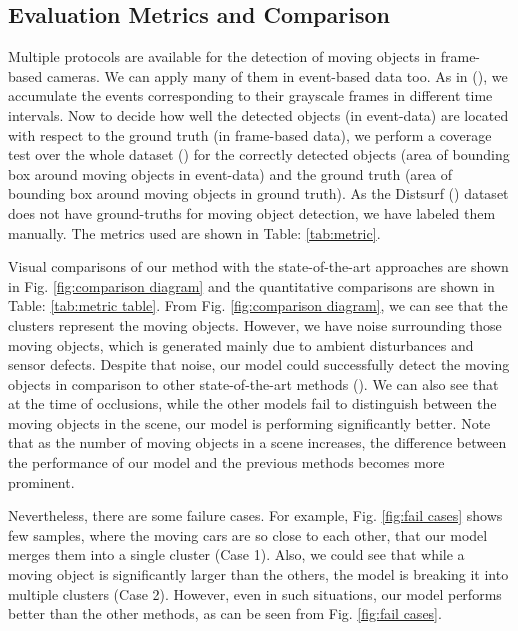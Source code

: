 \documentclass{article}
\begin{document}
\subsection{Evaluation Metrics and Comparison}

Multiple protocols are available for the detection of moving objects in frame-based cameras. We can apply many of them in event-based data too. As in (\cite{chen2018neuromorphic}), we accumulate the events corresponding to their grayscale frames in different time intervals. Now to decide how well the detected objects (in event-data) are located with respect to the ground truth (in frame-based data), we perform a coverage test over the whole dataset (\cite{pikatkowska2012spatiotemporal}) for the correctly detected objects  (area of bounding box around moving objects in event-data) and the ground truth  (area of bounding box around moving objects in ground truth). As the Distsurf (\cite{almatrafi2020distance}) dataset does not have ground-truths for moving object detection, we have labeled them manually. The metrics used are shown in Table: \ref{tab:metric}. 

Visual comparisons of our method with the state-of-the-art approaches are shown in Fig. \ref{fig:comparison diagram} and the quantitative comparisons are shown in Table: \ref{tab:metric table}. From Fig. \ref{fig:comparison diagram}, we can see that the clusters represent the moving objects. However, we have noise surrounding those moving objects, which is generated mainly due to ambient disturbances and sensor defects. Despite that noise, our model could successfully detect the moving objects in comparison to other state-of-the-art methods (\cite{pikatkowska2012spatiotemporal,chen2018neuromorphic,hinz2017online}). We can also see that at the time of occlusions, while the other models fail to distinguish between the moving objects in the scene, our model is performing significantly better. Note that as the number of moving objects in a scene increases, the difference between the performance of our model and the previous methods becomes more prominent. 

Nevertheless, there are some failure cases. For example, Fig. \ref{fig:fail cases} shows few samples, where the moving cars are so close to each other, that our model merges them into a single cluster (Case 1). Also, we could see that while a moving object is significantly larger than the others, the model is breaking it into multiple clusters (Case 2). However, even in such situations, our model performs better than the other methods, as can be seen from Fig. \ref{fig:fail cases}.
\end{document}
